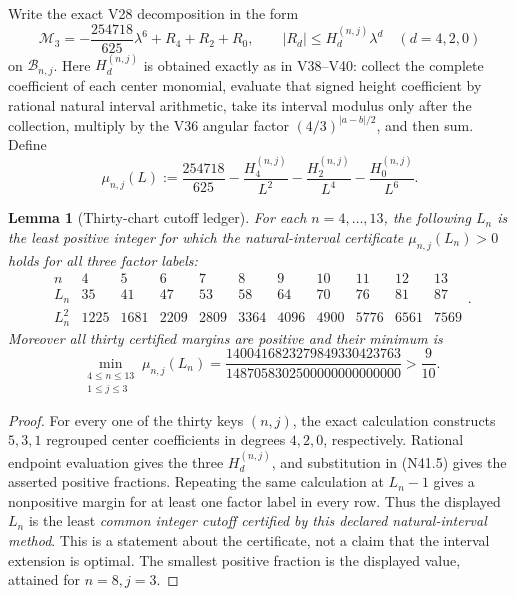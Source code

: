 \documentclass[11pt]{article}
\newtheorem{lemma}[theorem]{Lemma}
\theoremstyle{definition}
\theoremstyle{remark}
\begin{document}
Write the exact V28 decomposition in the form
\[
 \mathcal M_3
 =-\frac{254718}{625}\lambda^6+R_4+R_2+R_0,
 \qquad
 |R_d|\leq H^{(n,j)}_d\lambda^d
 \quad(d=4,2,0)
\tag{N41.4}
\]
on \(\mathcal B_{n,j}\).  Here \(H^{(n,j)}_d\) is obtained exactly as in
V38--V40: collect the complete coefficient of each center monomial,
evaluate that signed height coefficient by rational natural interval
arithmetic, take its interval modulus only after the collection, multiply
by the V36 angular factor \((4/3)^{|a-b|/2}\), and then sum.  Define
\[
 \mu_{n,j}(L):=
 \frac{254718}{625}
 -\frac{H^{(n,j)}_4}{L^2}
 -\frac{H^{(n,j)}_2}{L^4}
 -\frac{H^{(n,j)}_0}{L^6}.
\tag{N41.5}
\]

\begin{lemma}[Thirty-chart cutoff ledger]
\label{lem:f2v41-cutoffs}
For each \(n=4,\ldots,13\), the following \(L_n\) is the least positive
integer for which the natural-interval certificate
\(\mu_{n,j}(L_n)>0\) holds for all three factor labels:
\[
\begin{array}{c|rrrrrrrrrr}
n&4&5&6&7&8&9&10&11&12&13\\ \hline
L_n&35&41&47&53&58&64&70&76&81&87\\
L_n^2&1225&1681&2209&2809&3364&
4096&4900&5776&6561&7569
\end{array}.
\tag{N41.6}
\]
Moreover all thirty certified margins are positive and their minimum is
\[
 \min_{\substack{4\leq n\leq13\\1\leq j\leq3}}
 \mu_{n,j}(L_n)
 =
 \frac{1400416823279849330423763}
 {1487058302500000000000000}
 >\frac9{10}.
\tag{N41.7}
\]
\end{lemma}

\begin{proof}
For every one of the thirty keys \((n,j)\), the exact calculation
constructs \(5,3,1\) regrouped center coefficients in degrees \(4,2,0\),
respectively.  Rational endpoint evaluation gives the three
\(H^{(n,j)}_d\), and substitution in \textup{(N41.5)} gives the asserted
positive fractions.  Repeating the same calculation at \(L_n-1\) gives
a nonpositive margin for at least one factor label in every row.  Thus
the displayed \(L_n\) is the least \emph{common integer cutoff certified
by this declared natural-interval method}.  This is a statement about the
certificate, not a claim that the interval extension is optimal.  The
smallest positive fraction is the displayed value, attained for
\(n=8,j=3\).
\end{proof}
\end{document}
